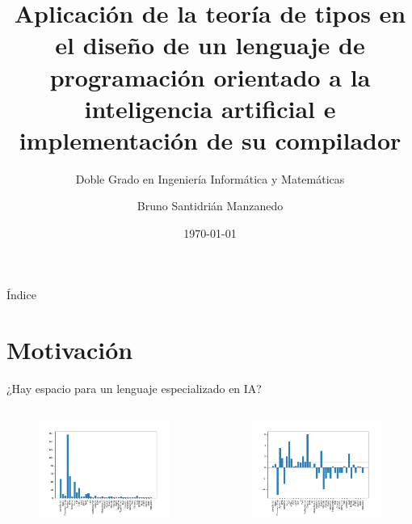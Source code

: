 \documentclass[compress]{beamer}
\title{Aplicación de la teoría de tipos en el diseño de un lenguaje
de programación orientado a la inteligencia artificial e
implementación de su compilador} %
\subtitle{
\centering Doble Grado en Ingeniería Informática y Matemáticas
}                                  %
\author{Bruno Santidrián Manzanedo}
\date{\today} %
\begin{document}
\begin{frame}
\titlepage
\end{frame}

\begin{frame}{Índice}
	\hypertarget{index}{}
	\tableofcontents
\end{frame}

\section{Motivación}
\begin{frame}{¿Hay espacio para un lenguaje especializado en IA?}
	\begin{columns}
		\begin{column}{0.5\paperwidth}
			\begin{figure}[h]
				\begin{center}
					\includegraphics[width=1.0\textwidth]{img/ai-lang.png}
				\end{center}
			\end{figure}
		\end{column}
		\begin{column}{0.5\paperwidth}
			\begin{figure}[h]
				\begin{center}
					\includegraphics[width=1.0\textwidth]{img/proportion-lang.png}

\end{center}
\end{figure}
\end{column}
\end{columns}
\end{frame}
\end{document}
